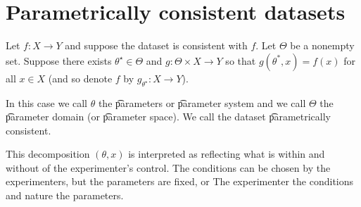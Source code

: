 \section*{Parametrically consistent datasets}

Let $f: X \to Y$ and suppose the dataset is consistent with $f$.
Let $\Theta $ be a nonempty set.
Suppose there exists $\theta ^\star \in \Theta $ and $g: \Theta \times X \to Y$ so that $g(\theta ^*, x) = f(x)$ for all $x \in X$ (and so denote $f$ by $g_{\theta ^{\star}}: X \to Y$).

In this case we call $\theta $ the \t{parameters} or \t{parameter system} and we call $\Theta $ the \t{parameter domain} (or \t{parameter space}).
We call the dataset \t{parametrically consistent}.

This decomposition $(\theta , x)$ is interpreted as reflecting what is within and without of the experimenter's control.
The conditions can be chosen by the experimenters, but the parameters are fixed, or 
The experimenter  the conditions and nature  the parameters.
